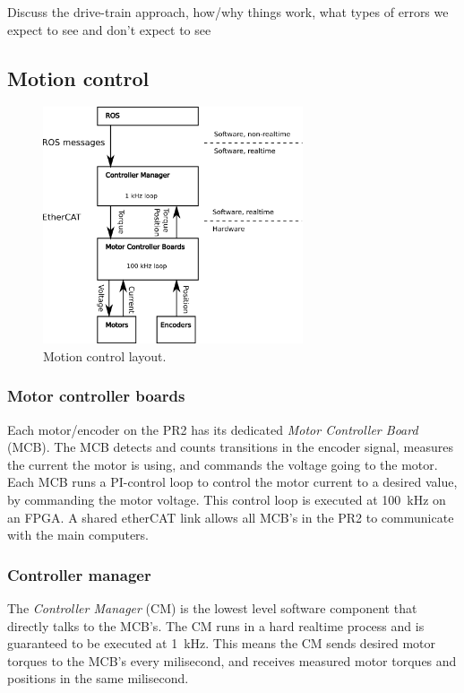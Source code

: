 Discuss the drive-train approach, how/why things work, what types of errors we expect to see and don't expect to see

\subsection{Motion control}


\begin{figure}[h]
\centering
\includegraphics[width=290px]{images/mechanism_control.png}
\caption{Motion control layout.}
\label{fig:motion_control}
\end{figure}


\subsubsection{Motor controller boards}
Each motor/encoder on the PR2 has its dedicated \emph{Motor Controller
  Board} (MCB). The MCB detects and counts transitions in the encoder
signal, measures the current the motor is using, and commands the
voltage going to the motor. Each MCB runs a PI-control loop to control
the motor current to a desired value, by commanding the motor
voltage. This control loop is executed at 100~kHz on an FPGA.  A
shared etherCAT link allows all MCB's in the PR2 to communicate with
the main computers.

\subsubsection{Controller manager}
The \emph{Controller Manager} (CM) is the lowest level software
component that directly talks to the MCB's. The CM runs in a hard
realtime process and is guaranteed to be executed at 1~kHz. This means
the CM sends desired motor torques to the MCB's every milisecond, and
receives measured motor torques and positions in the same milisecond.

